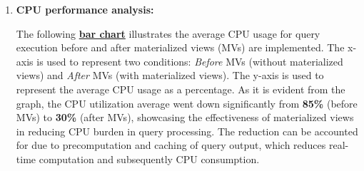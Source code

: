 \begin{enumerate}
\begin{itemize}





\end{itemize} \vspace{.4cm}

\item \textbf{CPU performance analysis:}

The following \hyperref[fig:cpu_usage]{\textbf{bar chart}} illustrates the average CPU usage for query execution before and after materialized views (MVs) are implemented. The x-axis is used to represent two conditions: \textit{Before} MVs (without materialized views) and \textit{After} MVs (with materialized views). The y-axis is used to represent the average CPU usage as a percentage. As it is evident from the graph, the CPU utilization average went down significantly from \textbf{85\%} (before MVs) to \textbf{30\%} (after MVs), showcasing the effectiveness of materialized views in reducing CPU burden in query processing. The reduction can be accounted for due to precomputation and caching of query output, which reduces real-time computation and subsequently CPU consumption.

%


\end{enumerate}

